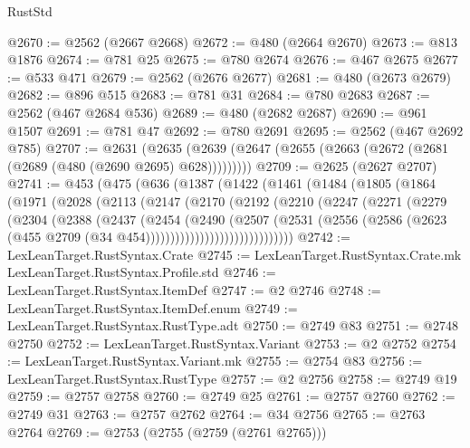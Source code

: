 \begin{lexlean}{RustStd}
\begin{coremodule}
@2670 := @2562 (@2667 @2668)
@2672 := @480 (@2664 @2670)
@2673 := @813 @1876
@2674 := @781 @25
@2675 := @780 @2674
@2676 := @467 @2675
@2677 := @533 @471
@2679 := @2562 (@2676 @2677)
@2681 := @480 (@2673 @2679)
@2682 := @896 @515
@2683 := @781 @31
@2684 := @780 @2683
@2687 := @2562 (@467 @2684 @536)
@2689 := @480 (@2682 @2687)
@2690 := @961 @1507
@2691 := @781 @47
@2692 := @780 @2691
@2695 := @2562 (@467 @2692 @785)
@2707 := @2631
    (@2635 (@2639 (@2647 (@2655 (@2663 (@2672 (@2681 (@2689 (@480 (@2690 @2695) @628)))))))))
@2709 := @2625 (@2627 @2707)
@2741 := @453
    (@475
      (@636
        (@1387
          (@1422
            (@1461
              (@1484
                (@1805
                  (@1864
                    (@1971
                      (@2028
                        (@2113
                          (@2147
                            (@2170
                              (@2192
                                (@2210
                                  (@2247
                                    (@2271
                                      (@2279
                                        (@2304
                                          (@2388
                                            (@2437
                                              (@2454
                                                (@2490
                                                  (@2507
                                                    (@2531
                                                      (@2556
                                                        (@2586
                                                          (@2623
                                                            (@455
                                                              @2709
                                                              (@34
                                                                @454))))))))))))))))))))))))))))))
@2742 := LexLeanTarget.RustSyntax.Crate
@2745 := LexLeanTarget.RustSyntax.Crate.mk LexLeanTarget.RustSyntax.Profile.std
@2746 := LexLeanTarget.RustSyntax.ItemDef
@2747 := @2 @2746
@2748 := LexLeanTarget.RustSyntax.ItemDef.enum
@2749 := LexLeanTarget.RustSyntax.RustType.adt
@2750 := @2749 @83
@2751 := @2748 @2750
@2752 := LexLeanTarget.RustSyntax.Variant
@2753 := @2 @2752
@2754 := LexLeanTarget.RustSyntax.Variant.mk
@2755 := @2754 @83
@2756 := LexLeanTarget.RustSyntax.RustType
@2757 := @2 @2756
@2758 := @2749 @19
@2759 := @2757 @2758
@2760 := @2749 @25
@2761 := @2757 @2760
@2762 := @2749 @31
@2763 := @2757 @2762
@2764 := @34 @2756
@2765 := @2763 @2764
@2769 := @2753 (@2755 (@2759 (@2761 @2765)))

\end{coremodule}
\end{lexlean}
